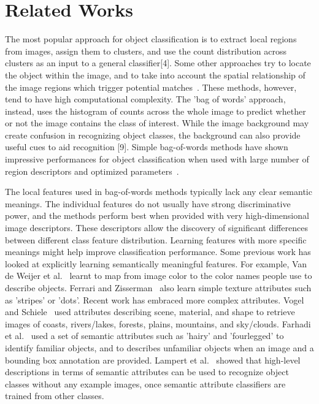\section{Related Works}
\label{sec:related_works}
The most popular approach for object classification is to extract
local regions from images, assign them to clusters, and use the count
distribution across clusters as an input to a general classifier[4].
Some other approaches try to locate the object within the image, and
to take into account the spatial relationship of the image regions
which trigger potential matches~\cite{ferrari2008learning}. These methods, however, tend to
have high computational complexity. The 'bag of words' approach,
instead, uses the histogram of counts across the whole image to
predict whether or not the image contains the class of interest. While
the image background may create confusion in recognizing object
classes, the background can also provide useful cues to aid
recognition [9]. Simple bag-of-words methods have shown
impressive performances for object classification when used with
large number of region descriptors and optimized parameters~\cite{marcin2007learning}.

The local features used in bag-of-words methods typically lack
any clear semantic meanings. The individual features do not usually
have strong discriminative power, and the methods perform best
when provided with very high-dimensional image descriptors.
These descriptors allow the discovery of significant differences
between different class feature distribution. Learning features
with more specific meanings might help improve classification
performance. Some previous work has looked at explicitly learning
semantically meaningful features. For example, Van de Weijer et al.~\cite{van2009learning} learnt to map from image color to the color names people use to describe objects. 
Ferrari and Zisserman~\cite{ferrari2007learning} also learn simple texture attributes such as 'stripes' or 'dots'.
Recent work has embraced more complex attributes. Vogel and Schiele~\cite{vogel2004natural} used attributes
describing scene, material, and shape to retrieve images of coasts,
rivers/lakes, forests, plains, mountains, and sky/clouds.
Farhadi et al.~\cite{farhadi2009describing} used a set of semantic attributes such as 'hairy' and 'fourlegged' to identify familiar objects, and to describes unfamiliar objects when an image and a bounding box annotation are provided.
Lampert et al.~\cite{larmpert2009learning} showed that high-level descriptions in terms of
semantic attributes can be used to recognize object classes without
any example images, once semantic attribute classifiers are trained from other classes.

